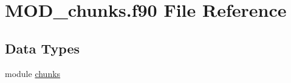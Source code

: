 \hypertarget{MOD__chunks_8f90}{\section{M\-O\-D\-\_\-chunks.\-f90 File Reference}
\label{MOD__chunks_8f90}
}
\subsection*{Data Types}
\begin{DoxyCompactItemize}
\item 
module \hyperlink{classchunks}{chunks}
\end{DoxyCompactItemize}
